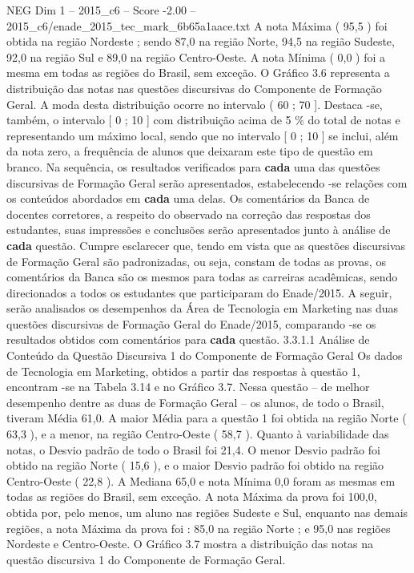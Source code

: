 \begin{textsample}{NEG Dim 1 – 2015\_c6 – Score -2.00 – 2015\_c6/enade\_2015\_tec\_mark\_6b65a1aace.txt}
A nota Máxima ( 95,5 ) foi obtida na região Nordeste ; sendo 87,0 na região Norte, 94,5 na região Sudeste, 92,0 na região Sul e 89,0 na região Centro-Oeste.
A nota Mínima ( 0,0 ) foi a mesma em todas as regiões do Brasil, sem exceção.
O Gráfico 3.6 representa a distribuição das notas nas questões discursivas do Componente de Formação Geral.
A moda desta distribuição ocorre no intervalo ( 60 ; 70 ].
Destaca -se, também, o intervalo [ 0 ; 10 ] com distribuição acima de 5 \% do total de notas e representando um máximo local, sendo que no intervalo [ 0 ; 10 ] se inclui, além da nota zero, a frequência de alunos que deixaram este tipo de questão em branco.
Na sequência, os resultados verificados para \textbf{cada} uma das questões discursivas de Formação Geral serão apresentados, estabelecendo -se relações com os conteúdos abordados em \textbf{cada} uma delas.
Os comentários da Banca de docentes corretores, a respeito do observado na correção das respostas dos estudantes, suas impressões e conclusões serão apresentados junto à análise de \textbf{cada} questão.
Cumpre esclarecer que, tendo em vista que as questões discursivas de Formação Geral são padronizadas, ou seja, constam de todas as provas, os comentários da Banca são os mesmos para todas as carreiras acadêmicas, sendo direcionados a todos os estudantes que participaram do Enade/2015.
A seguir, serão analisados os desempenhos da Área de Tecnologia em Marketing nas duas questões discursivas de Formação Geral do Enade/2015, comparando -se os resultados obtidos com comentários para \textbf{cada} questão. 3.3.1.1 Análise de Conteúdo da Questão Discursiva 1 do Componente de Formação Geral Os dados de Tecnologia em Marketing, obtidos a partir das respostas à questão 1, encontram -se na Tabela 3.14 e no Gráfico 3.7.
Nessa questão – de melhor desempenho dentre as duas de Formação Geral – os alunos, de todo o Brasil, tiveram Média 61,0.
A maior Média para a questão 1 foi obtida na região Norte ( 63,3 ), e a menor, na região Centro-Oeste ( 58,7 ).
Quanto à variabilidade das notas, o Desvio padrão de todo o Brasil foi 21,4.
O menor Desvio padrão foi obtido na região Norte ( 15,6 ), e o maior Desvio padrão foi obtido na região Centro-Oeste ( 22,8 ).
A Mediana 65,0 e nota Mínima 0,0 foram as mesmas em todas as regiões do Brasil, sem exceção.
A nota Máxima da prova foi 100,0, obtida por, pelo menos, um aluno nas regiões Sudeste e Sul, enquanto nas demais regiões, a nota Máxima da prova foi : 85,0 na região Norte ; e 95,0 nas regiões Nordeste e Centro-Oeste.
O Gráfico 3.7 mostra a distribuição das notas na questão discursiva 1 do Componente de Formação Geral.

\end{textsample}

